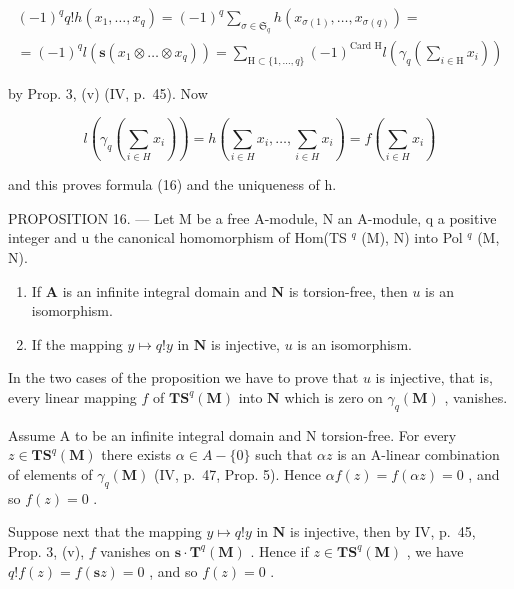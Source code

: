 \[
\begin{array}{l} (- 1) ^ {q} q! h (x _ {1}, \dots , x _ {q}) = (- 1) ^ {q} \sum_ {\sigma \in \mathfrak {S} _ {q}} h (x _ {\sigma (1)}, \dots , x _ {\sigma (q)}) = \\ = (- 1) ^ {q} l (\mathbf {s} (x _ {1} \otimes \dots \otimes x _ {q})) = \sum_ {\mathrm{H} \subset \{1, \dots , q \}} (- 1) ^ {\text {Card H}} l \left(\gamma_ {q} \left(\sum_ {i \in \mathrm{H}} x _ {i}\right)\right) \end{array}
\]

by Prop. 3, (v) (IV, p.~45). Now

\[
l \left(\gamma_ {q} \left(\sum_ {i \in H} x _ {i}\right)\right) = h \left(\sum_ {i \in H} x _ {i}, \dots , \sum_ {i \in H} x _ {i}\right) = f \left(\sum_ {i \in H} x _ {i}\right)
\]

and this proves formula (16) and the uniqueness of h.

PROPOSITION 16. --- Let M be a free A-module, N an A-module, q a positive integer and u the canonical homomorphism of Hom(TS \(^{q}\) (M), N) into Pol \(^{q}\) (M, N).

\begin{enumerate}
\def\labelenumi{(\roman{enumi})}
\item
  If \(\mathbf{A}\) is an infinite integral domain and \(\mathbf{N}\) is torsion-free, then \(u\) is an isomorphism.
\item
  If the mapping \(y \mapsto q!y\) in \(\mathbf{N}\) is injective, \(u\) is an isomorphism.
\end{enumerate}

In the two cases of the proposition we have to prove that \(u\) is injective, that is, every linear mapping \(f\) of \(\mathbf{TS}^q(\mathbf{M})\) into \(\mathbf{N}\) which is zero on \(\gamma_q(\mathbf{M})\) , vanishes.

Assume A to be an infinite integral domain and N torsion-free. For every \(z \in \mathbf{TS}^{q}(\mathbf{M})\) there exists \(\alpha \in A - \{0\}\) such that \(\alpha z\) is an A-linear combination of elements of \(\gamma_{q}(\mathbf{M})\) (IV, p.~47, Prop. 5). Hence \(\alpha f(z) = f(\alpha z) = 0\) , and so \(f(z) = 0\) .

Suppose next that the mapping \(y \mapsto q!y\) in \(\mathbf{N}\) is injective, then by IV, p.~45, Prop. 3, (v), \(f\) vanishes on \(\mathbf{s} \cdot \mathbf{T}^q(\mathbf{M})\) . Hence if \(z \in \mathbf{T}\mathbf{S}^q(\mathbf{M})\) , we have \(q!f(z) = f(\mathbf{s}z) = 0\) , and so \(f(z) = 0\) .

